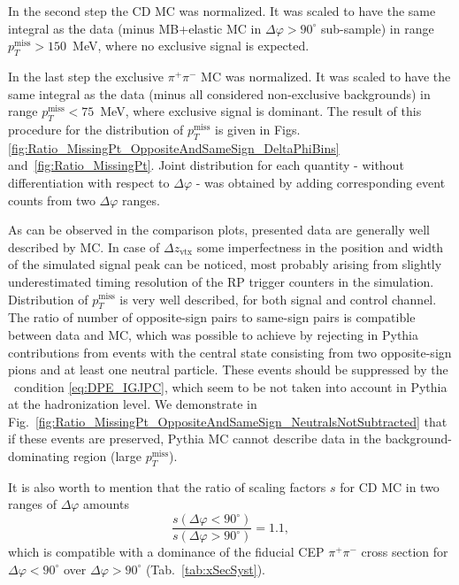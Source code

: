 In the second step the CD MC was normalized. It was scaled to have the same integral as the data (minus MB+elastic MC in $\Delta\varphi>90^{\circ}$ sub-sample) in range $p_{T}^{\text{miss}}>150$~MeV, where no exclusive signal is expected.

In the last step the exclusive $\pi^{+}\pi^{-}$ MC was normalized. It was scaled to have the same integral as the data (minus all considered non-exclusive backgrounds) in range $p_{T}^{\text{miss}}<75$~MeV, where exclusive signal is dominant. The result of this procedure for the distribution of $p_{T}^{\text{miss}}$ is given in Figs.\ref{fig:Ratio_MissingPt_OppositeAndSameSign_DeltaPhiBins} and~\ref{fig:Ratio_MissingPt}. Joint distribution for each quantity - without differentiation with respect to $\Delta\varphi$ - was obtained by adding corresponding event counts from two $\Delta\varphi$ ranges.

As can be observed in the comparison plots, presented data are generally well described by MC. In case of $\Delta z_{\text{vtx}}$ some imperfectness in the position and width of the simulated signal peak can be noticed, most probably arising from slightly underestimated timing resolution of the RP trigger counters in the simulation. Distribution of $p_{T}^{\text{miss}}$ is very well described, for both signal and control channel. The ratio of number of opposite-sign pairs to same-sign pairs is compatible between data and MC, which was possible to achieve by rejecting in Pythia contributions from events with the central state consisting from two opposite-sign pions and at least one neutral particle. These events should be suppressed by the \DPE\ condition \eqref{eq:DPE_IGJPC}, which seem to be not taken into account in Pythia at the hadronization level. We demonstrate in Fig.~\ref{fig:Ratio_MissingPt_OppositeAndSameSign_NeutralsNotSubtracted} that if these events are preserved, Pythia MC cannot describe data in the background-dominating region (large $p_{T}^{\text{miss}}$).

It is also worth to mention that the ratio of scaling factors $s$ for CD MC in two ranges of $\Delta\varphi$ amounts%
\begin{equation}\label{eq:scalingCD}%
\frac{s(\Delta\varphi<90^{\circ})}{s(\Delta\varphi>90^{\circ})} = 1.1,  
\end{equation}
which is compatible with a dominance of the fiducial CEP $\pi^{+}\pi^{-}$ cross section for $\Delta\varphi<90^{\circ}$ over $\Delta\varphi>90^{\circ}$ (Tab.~\ref{tab:xSecSyst}).

